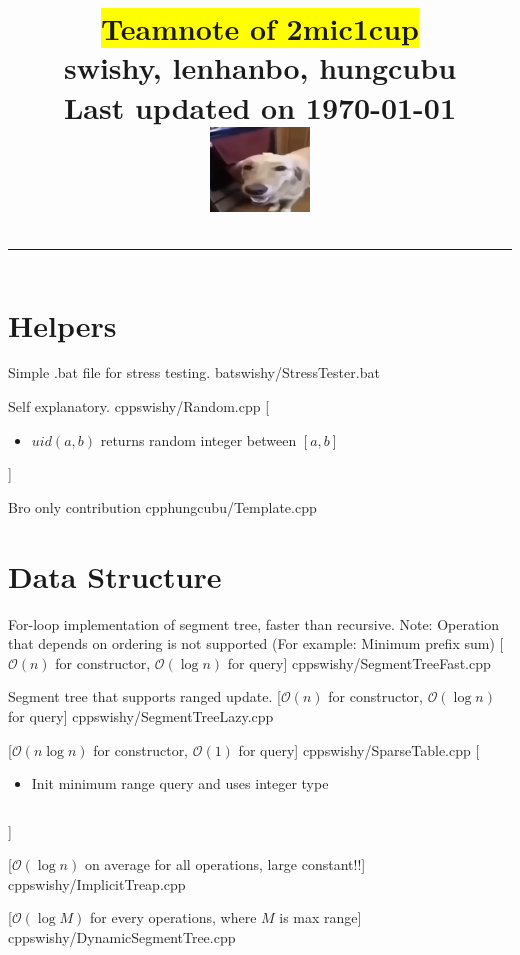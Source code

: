 \documentclass[8pt,a4paper,oneside,twocolumn]{extarticle}
\title{
    \colorbox{yellow}{\textbf{Teamnote of 2mic1cup}} \\ \vspace{1em}
    \large swishy, lenhanbo, hungcubu \\ \vspace{1em}
    \large Last updated on \today \\ \vspace{1em}
    \includegraphics[width=0.2\textwidth]{buttadog.png} \vspace{1em}
    \hrule 
}
\date{}
\newcommand{\currentsectiontitle}{}
\newcommand{\msection}[1]{\section{#1}\gdef\currentsectiontitle{#1}}
\begin{document}
\maketitle
\tableofcontents
\newpage


\msection{Helpers}

{Simple .bat file for stress testing.}
{bat}{swishy/StressTester.bat}

{Self explanatory.}
{cpp}{swishy/Random.cpp}
[
\begin{itemize} 
    \item {$uid(a, b)$ returns random integer between $[a, b]$}
\end{itemize}
]

{Bro only contribution}
{cpp}{hungcubu/Template.cpp}


\msection{Data Structure}
{For-loop implementation of segment tree, faster than recursive. Note: Operation that depends on ordering is not supported (For example: Minimum prefix sum)}
[$\mathcal{O}(n)$ for constructor, $\mathcal{O}(\log n)$ for query]
{cpp}{swishy/SegmentTreeFast.cpp}

{Segment tree that supports ranged update.}
[$\mathcal{O}(n)$ for constructor, $\mathcal{O}(\log n)$ for query]
{cpp}{swishy/SegmentTreeLazy.cpp}

[$\mathcal{O}(n\log n)$ for constructor, $\mathcal{O}(1)$ for query]
{cpp}{swishy/SparseTable.cpp}
[
    \begin{itemize}
        \item Init minimum range query and uses integer type \inputminted{cpp}{swishy/examples/SparseTable.cpp}
    \end{itemize}
]

[$\mathcal{O}(\log n)$ on average for all operations, large constant!!]
{cpp}{swishy/ImplicitTreap.cpp}

[$\mathcal{O}(\log M)$ for every operations, where $M$ is max range]
{cpp}{swishy/DynamicSegmentTree.cpp}
\end{document}
